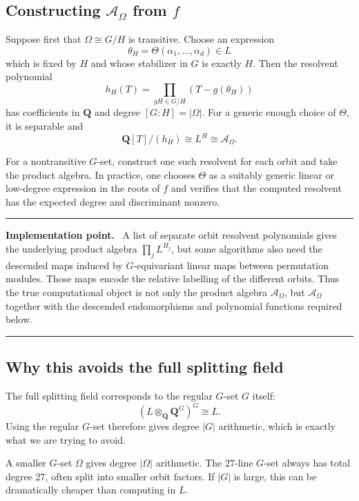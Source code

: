 \documentclass[11pt]{article}
\newcommand{\QQ}{\mathbf{Q}}
\newcommand{\cA}{\mathcal{A}}
\newenvironment{implementationbox}{%
  \begin{center}\begin{minipage}{0.94\textwidth}\small
  \hrule\vspace{0.55em}\textbf{Implementation point.}\ }{%
  \vspace{0.55em}\hrule\end{minipage}\end{center}%
}
\begin{document}
\subsection{Constructing $\cA_\Omega$ from $f$}

Suppose first that $\Omega\cong G/H$ is transitive.  Choose an expression
\[
  \theta_H=\Theta(\alpha_1,\ldots,\alpha_d)\in L
\]
which is fixed by $H$ and whose stabilizer in $G$ is exactly $H$.  Then the
resolvent polynomial
\begin{equation}
  h_H(T)=\prod_{gH\in G/H}\left(T-g(\theta_H)\right)
  \label{eq:resolvent-polynomial}
\end{equation}
has coefficients in $\QQ$ and degree $[G:H]=|\Omega|$.  For a generic enough
choice of $\Theta$, it is separable and
\[
  \QQ[T]/(h_H)\cong L^H\cong\cA_\Omega.
\]

For a nontransitive $G$-set, construct one such resolvent for each orbit and take
the product algebra.  In practice, one chooses $\Theta$ as a suitably generic
linear or low-degree expression in the roots of $f$ and verifies that the computed
resolvent has the expected degree and discriminant nonzero.

\begin{implementationbox}
A list of separate orbit resolvent polynomials gives the underlying product
algebra $\prod_j L^{H_j}$, but some algorithms also need the descended maps induced
by $G$-equivariant linear maps between permutation modules.  Those maps encode the
relative labelling of the different orbits.  Thus the true computational object is
not only the product algebra $\cA_\Omega$, but $\cA_\Omega$ together with the
descended endomorphisms and polynomial functions required below.
\end{implementationbox}

\subsection{Why this avoids the full splitting field}

The full splitting field corresponds to the regular $G$-set $G$ itself:
\[
  (L\otimes_\QQ \QQ^G)^G\cong L.
\]
Using the regular $G$-set therefore gives degree $|G|$ arithmetic, which is exactly
what we are trying to avoid.

A smaller $G$-set $\Omega$ gives degree $|\Omega|$ arithmetic.  The $27$-line
$G$-set always has total degree $27$, often split into smaller orbit factors.  If
$|G|$ is large, this can be dramatically cheaper than computing in $L$.
\end{document}
